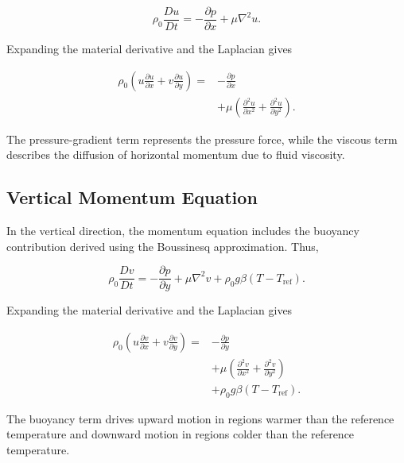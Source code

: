 \documentclass[preprint,3p,number]{elsarticle}
\begin{document}
\begin{equation}
\rho_0\frac{Du}{Dt}
=-\frac{\partial p}{\partial x}
+\mu\nabla^2u.
\end{equation}

Expanding the material derivative and the Laplacian gives

\begin{equation}
\boxed{
\begin{aligned}
\rho_0\left(
u\frac{\partial u}{\partial x}
+v\frac{\partial u}{\partial y}
\right)
={}&-\frac{\partial p}{\partial x}\\
&+\mu\left(
\frac{\partial^2u}{\partial x^2}
+\frac{\partial^2u}{\partial y^2}
\right).
\end{aligned}
}
\label{eq:xmomentum}
\end{equation}

The pressure-gradient term represents the pressure force,
while the viscous term describes the diffusion of horizontal
momentum due to fluid viscosity.

\subsection{Vertical Momentum Equation}

In the vertical direction, the momentum equation includes
the buoyancy contribution derived using the Boussinesq
approximation. Thus,

\begin{equation}
\rho_0\frac{Dv}{Dt}
=-\frac{\partial p}{\partial y}
+\mu\nabla^2v
+\rho_0g\beta(T-T_{\mathrm{ref}}).
\end{equation}

Expanding the material derivative and the Laplacian gives

\begin{equation}
\boxed{
\begin{aligned}
\rho_0\left(
u\frac{\partial v}{\partial x}
+v\frac{\partial v}{\partial y}
\right)
={}&-\frac{\partial p}{\partial y}\\
&+\mu\left(
\frac{\partial^2v}{\partial x^2}
+\frac{\partial^2v}{\partial y^2}
\right)\\
&+\rho_0g\beta(T-T_{\mathrm{ref}}).
\end{aligned}
}
\label{eq:ymomentum}
\end{equation}

The buoyancy term drives upward motion in regions warmer
than the reference temperature and downward motion in
regions colder than the reference temperature.
\end{document}
